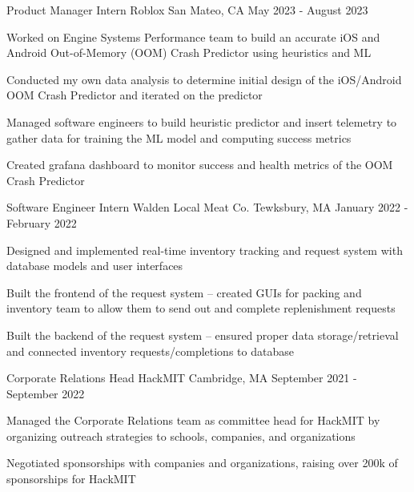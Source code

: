 \documentclass[12pt, letterpaper]{awesome-cv}
\begin{document}
\begin{cventries}
  \cventry
      {Product Manager Intern} %
      {Roblox} %
      {San Mateo, CA} %
      {May 2023 - August 2023} %
      {
        \begin{cvitems} %
          \item {Worked on Engine Systems Performance team to build an accurate iOS and Android Out-of-Memory (OOM) Crash Predictor using heuristics and ML}
          \item {Conducted my own data analysis to determine initial design of the iOS/Android OOM Crash Predictor and iterated on the predictor}
          \item {Managed software engineers to build heuristic predictor and insert telemetry to gather data for training the ML model and computing success metrics}
          \item {Created grafana dashboard to monitor success and health metrics of the OOM Crash Predictor}
      \end{cvitems}
    }

  \cventry
      {Software Engineer Intern} %
      {Walden Local Meat Co.} %
      {Tewksbury, MA} %
      {January 2022 - February 2022} %
      {
        \begin{cvitems} %
          \item {Designed and implemented real-time inventory tracking and request system with database models and user interfaces}
          \item {Built the frontend of the request system -- created GUIs for packing and inventory team to allow them to send out and complete replenishment requests}
          \item {Built the backend of the request system -- ensured proper data storage/retrieval and connected inventory requests/completions to database}
      \end{cvitems}
    }

  \cventry
    {Corporate Relations Head} %
    {HackMIT} %
    {Cambridge, MA} %
    {September 2021 - September 2022} %
    {
      \begin{cvitems} %
        \item {Managed the Corporate Relations team as committee head for HackMIT by organizing outreach strategies to schools, companies, and organizations}
        \item {Negotiated sponsorships with companies and organizations, raising over 200k of sponsorships for HackMIT}
      \end{cvitems}
    }


\end{cventries}
\end{document}
